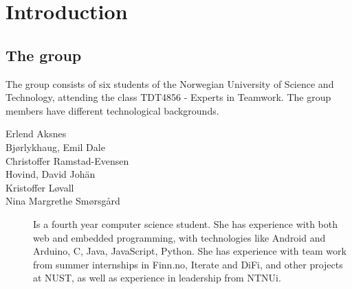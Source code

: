 \chapter{Introduction}
\section{The group}
The group consists of six students of the Norwegian University of Science and Technology, 
attending the class TDT4856 - Experts in Teamwork. The group members have different technological backgrounds.
\begin{description}
	\item[Erlend Aksnes] %
	\item[Bjørlykhaug, Emil Dale] %
	\item[Christoffer Ramstad-Evensen] %
	\item[Hovind, David Johän] %
	\item[Kristoffer Løvall] %
	\item[Nina Margrethe Smørsgård] \comment{\hfill \\}Is a fourth year computer science student. 
	She has experience with both web and embedded programming, with technologies like 
	Android and Arduino, C, Java, JavaScript, Python. She has experience with team 
	work from summer internships in Finn.no, Iterate and DiFi, and other projects at NUST, 
	as well as experience in leadership from NTNUi.
\end{description}